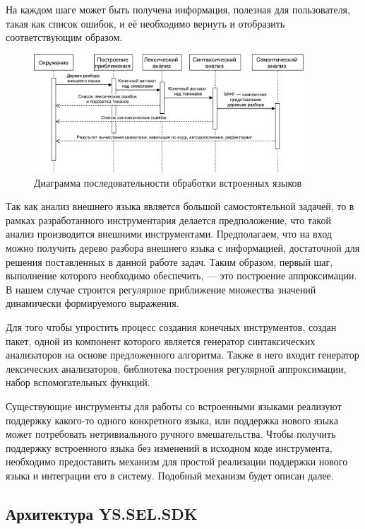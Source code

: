 На каждом шаге может быть получена информация, полезная для пользователя, такая как список ошибок, и её необходимо вернуть и отобразить соответствующим образом.

\begin{figure}[h!]
\begin{center}
\includegraphics[width=0.9\textwidth]{pics/Seq_sel_processing_rus}
\caption{Диаграмма последовательности обработки встроенных языков}
\label{fig:SeqSelProcessing} 
\end{center}
\end{figure}

Так как анализ внешнего языка является большой самостоятельной задачей, то в рамках разработанного инструментария делается предположение, что такой анализ производится внешними инструментами. Предполагаем, что на вход можно получить дерево разбора внешнего языка с информацией, достаточной для решения поставленных в данной работе задач. Таким образом, первый шаг, выполнение которого необходимо обеспечить, --- это построение аппроксимации. В нашем случае строится регулярное приближение множества значений динамически формируемого выражения.

Для того чтобы упростить процесс создания конечных инструментов, создан пакет, одной из компонент которого является генератор синтаксических анализаторов на основе предложенного алгоритма. Также в него входит генератор лексических анализаторов, библиотека построения регулярной аппроксимации, набор вспомогательных функций.

Существующие инструменты для работы со встроенными языками реализуют поддержку какого-то одного конкретного языка, или поддержка нового языка может потребовать нетривиального ручного вмешательства. Чтобы получить поддержку встроенного языка без изменений в исходном коде инструмента, необходимо предоставить механизм для простой реализации поддержки нового языка и интеграции его в систему. Подобный механизм будет описан далее.


\subsection{Архитектура YS.SEL.SDK}

